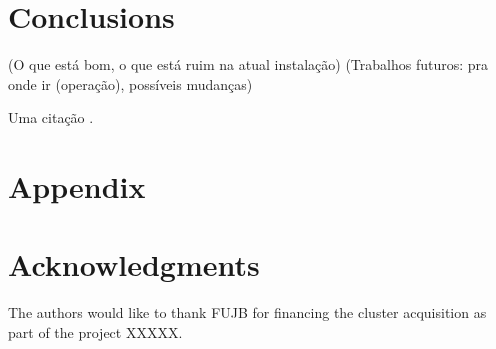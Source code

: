 \documentclass{anstrans}
\begin{document}
\section{Conclusions}

(O que está bom, o que está ruim na atual instalação)
(Trabalhos futuros: pra onde ir (operação), possíveis mudanças)

Uma citação \cite{Henderson17}.

\appendix
\section{Appendix}

\section{Acknowledgments}
The authors would like to thank FUJB for financing the cluster acquisition
as part of the project XXXXX.


\end{document}
